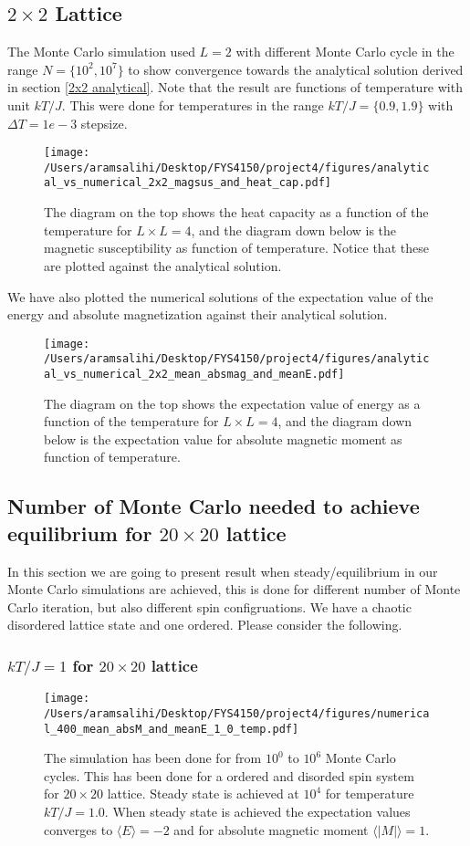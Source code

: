 \documentclass[a4paper, 10pt]{article}
\begin{document}
\subsection{$2\times 2$ Lattice \label{2x2 result}} The Monte Carlo simulation used $L = 2$ with different Monte Carlo cycle in the range
$N = \{10^{2}, 10^{7}\}$ to show convergence towards the analytical solution derived in section \eqref{2x2 analytical}. Note that the result are functions
of temperature with unit $kT/J$. This were done for temperatures in the range $kT/J = \{0.9,1.9\}$ with $\Delta T = 1e-3$ stepsize.

\begin{figure}[H]
  \texttt{[image: /Users/aramsalihi/Desktop/FYS4150/project4/figures/analytical\_vs\_numerical\_2x2\_magsus\_and\_heat\_cap.pdf]}
  \centering
  \caption{The diagram on the top shows the heat capacity as a function of the temperature for $L\times L = 4$, and the diagram down below
  is the magnetic susceptibility as function of temperature. Notice that these are plotted against the analytical solution.}
  \label{magsus og heatcap}
\end{figure}
We have also plotted the numerical solutions of the expectation value of the energy and absolute magnetization against their
analytical solution.
\begin{figure}[H]
  \texttt{[image: /Users/aramsalihi/Desktop/FYS4150/project4/figures/analytical\_vs\_numerical\_2x2\_mean\_absmag\_and\_meanE.pdf]}
  \centering
  \caption{The diagram on the top shows the expectation value of energy as a function of the temperature for $L\times L = 4$, and the diagram down below
  is the expectation value for absolute magnetic moment as function of temperature.}
  \label{meanE meanM}
\end{figure}
\subsection{Number of Monte Carlo needed to achieve equilibrium for $20\times 20$ lattice}
In this section we are going to present result when steady/equilibrium in our Monte Carlo simulations are achieved, this is done for  different number of Monte Carlo iteration, but also
different spin configruations. We have a chaotic disordered lattice state and one ordered.
Please consider the following.
\subsubsection{$kT/J = 1$ for $20\times 20$ lattice}
\begin{figure}[H]
  \texttt{[image: /Users/aramsalihi/Desktop/FYS4150/project4/figures/numerical\_400\_mean\_absM\_and\_meanE\_1\_0\_temp.pdf]}
  \centering
  \caption{The simulation has been done for from $10^{0}$ to $10^{6}$ Monte Carlo cycles. This has been done for
  a ordered and disorded spin system for $20\times 20$ lattice. Steady state is achieved at $10^{4}$ for temperature $kT/J = 1.0$.
  When steady state is achieved the expectation values converges to $\langle E \rangle = -2$ and for absolute magnetic moment $\langle |M| \rangle = 1$.}
  \label{T = 1 20x20}
\end{figure}
\end{document}

